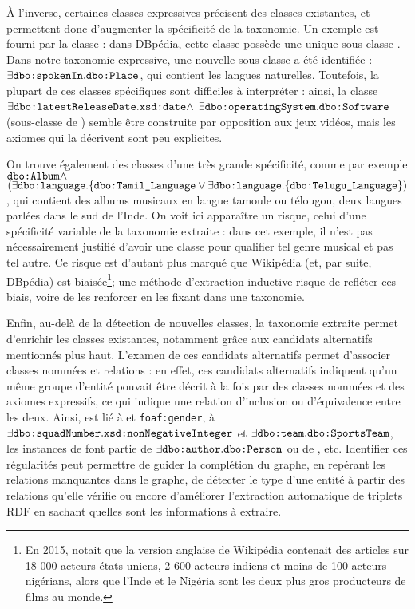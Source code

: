 À l'inverse, certaines classes expressives précisent des classes existantes, et permettent donc d'augmenter la spécificité de la taxonomie. Un exemple est fourni par la classe  : dans DBpédia, cette classe possède une unique sous-classe . Dans notre taxonomie expressive, une nouvelle sous-classe a été identifiée : $\exists \texttt{dbo:spokenIn}.\texttt{dbo:Place}$, qui contient les langues naturelles.
%
Toutefois, la plupart de ces classes spécifiques sont difficiles à interpréter : ainsi, la classe $\exists \texttt{dbo:latestReleaseDate}.\texttt{xsd:date} \land$ $\exists \texttt{dbo:operatingSystem} \allowbreak .\texttt{dbo:Software}$ (sous-classe de ) semble être construite par opposition aux jeux vidéos, mais les axiomes qui la décrivent sont peu explicites.
%

On trouve également des classes d'une très grande spécificité, comme par exemple $\texttt{dbo:Album}  \allowbreak \land$ $(\exists \allowbreak  \texttt{dbo:language} . \allowbreak \{ \texttt{dbo:Tamil\_Language}  \allowbreak\lor \allowbreak \exists \texttt{dbo:language}. \allowbreak \{ \texttt{dbo:Telugu\_Language} \}) $, qui contient des albums musicaux en langue tamoule ou télougou, deux langues parlées dans le sud de l'Inde. On voit ici apparaître un risque, celui d'une spécificité variable de la taxonomie extraite : dans cet exemple, il n'est pas nécessairement justifié d'avoir une classe pour qualifier tel genre musical et pas tel autre. 
Ce risque est d'autant plus marqué que Wikipédia (et, par suite, DBpédia) est biaisée\footnote{En 2015, \cite{nickel2015review} notait que la version anglaise de Wikipédia contenait des articles sur 18 000 acteurs états-uniens, 2 600 acteurs indiens et moins de 100 acteurs nigérians, alors que l'Inde et le Nigéria sont les deux plus gros producteurs de films au monde.}; une méthode d'extraction inductive risque de refléter ces biais, voire de les renforcer en les fixant dans une taxonomie.

Enfin, au-delà de la détection de nouvelles classes, la taxonomie extraite permet d'enrichir les classes existantes, notamment grâce aux candidats alternatifs mentionnés plus haut. L'examen de ces candidats alternatifs permet d'associer classes nommées et relations : en effet, ces candidats alternatifs indiquent qu'un même groupe d'entité pouvait être décrit à la fois par des classes nommées et des axiomes expressifs, ce qui indique une relation d'inclusion ou d'équivalence entre les deux. Ainsi,  est lié à  et \texttt{foaf:gender},  à $\exists \texttt{dbo:squadNumber}.\allowbreak \texttt{xsd:nonNegativeInteger}$ et $\exists \texttt{dbo:team}. \allowbreak \texttt{dbo:SportsTeam}$, les instances de  font partie de $\exists \texttt{dbo:author}. \allowbreak \texttt{dbo:Person}$ ou de , etc.
Identifier ces régularités peut permettre de guider la complétion du graphe, en repérant les relations manquantes dans le graphe, de détecter le type d'une entité à partir des relations qu'elle vérifie ou encore d'améliorer l'extraction automatique de triplets RDF en sachant quelles sont les informations à extraire.




